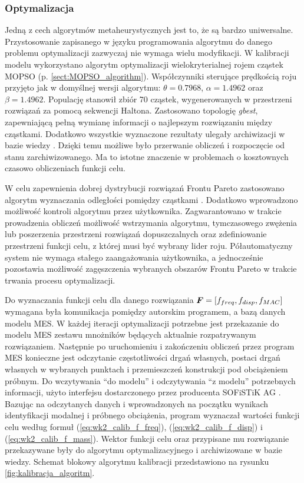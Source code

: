 \subsubsection{Optymalizacja}
Jedną z cech algorytmów metaheurystycznych jest to, że są bardzo uniwersalne. Przystosowanie zapisanego w języku programowania algorytmu do danego problemu optymalizacji zazwyczaj nie wymaga wielu modyfikacji. W kalibracji modelu wykorzystano algorytm optymalizacji wielokryterialnej rojem cząstek MOPSO (p. \ref{sect:MOPSO_algorithm}). Współczynniki sterujące prędkością roju przyjęto jak w domyślnej wersji algorytmu: $\theta=0.7968$, $\alpha=1.4962$ oraz $\beta=1.4962$. Populację stanowił zbiór 70 cząstek, wygenerowanych w przestrzeni rozwiązań za pomocą sekwencji Haltona. Zastosowano topologię \textit{gbest}, zapewniającą pełną wymianę informacji o najlepszym rozwiązaniu między cząstkami. Dodatkowo wszystkie wyznaczone rezultaty ulegały archiwizacji w bazie wiedzy . Dzięki temu możliwe było przerwanie obliczeń i rozpoczęcie od stanu zarchiwizowanego. Ma to istotne znaczenie w problemach o kosztownych czasowo obliczeniach funkcji celu. 

W celu zapewnienia dobrej dystrybucji rozwiązań Frontu Pareto zastosowano algorytm wyznaczania odległości pomiędzy cząstkami \parencite{Deb2002}. Dodatkowo wprowadzono możliwość kontroli algorytmu przez użytkownika. Zagwarantowano w trakcie prowadzenia obliczeń możliwość wstrzymania algorytmu, tymczasowego zwężenia lub poszerzenia przestrzeni rozwiązań dopuszczalnych oraz zdefiniowanie przestrzeni funkcji celu, z której musi być wybrany lider roju. Półautomatyczny system nie wymaga stałego zaangażowania użytkownika, a jednocześnie pozostawia możliwość zagęszczenia wybranych obszarów Frontu Pareto w trakcie trwania procesu optymalizacji.

Do wyznaczania funkcji celu dla danego rozwiązania $\bm{F}=[f_{freq},f_{disp},f_{MAC}]$ wymagana była komunikacja pomiędzy autorskim programem, a bazą danych modelu MES. W każdej iteracji optymalizacji potrzebne jest przekazanie do modelu MES zestawu mnożników będących aktualnie rozpatrywanym rozwiązaniem. Następnie po uruchomieniu i zakończeniu obliczeń przez program MES konieczne jest odczytanie częstotliwości drgań własnych, postaci drgań własnych w wybranych punktach i przemieszczeń konstrukcji pod obciążeniem próbnym. Do wczytywania \enquote{do modelu} i odczytywania \enquote{z modelu} potrzebnych informacji, użyto interfejsu dostarczonego przez producenta SOFiSTiK AG \parencite{SOFISTIK2018}. Bazując na odczytanych danych i wprowadzonych na początku wynikach identyfikacji modalnej i próbnego obciążenia, program wyznaczał wartości funkcji celu według formuł (\ref{eq:wk2_calib_f_freq}), (\ref{eq:wk2_calib_f_disp}) i (\ref{eq:wk2_calib_f_mass}). Wektor funkcji celu oraz przypisane mu rozwiązanie przekazywane były do algorytmu optymalizacyjnego i archiwizowane w bazie wiedzy. Schemat blokowy algorytmu kalibracji przedstawiono na rysunku \ref{fig:kalibracja_algoritm}. 


